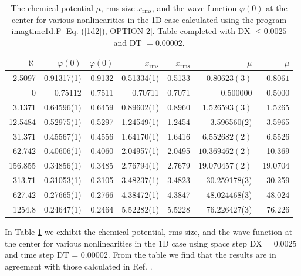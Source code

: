 \documentclass[onecolumn]{elsart3p}
\begin{document}
\begin{table}[!ht]
\begin{center}
\caption{The chemical potential $\mu$,
rms size {$x_{\mathrm{rms}}$}, and the wave function
$\varphi(0)$ at the center  for various
nonlinearities
 in the  1D case calculated using the program imagtime1d.F
[Eq. (\ref{1d2}), OPTION 2]. Table
completed with DX $\le 0.0025$ and
DT $=0.00002$.
}
\label{table3}
\begin{tabular}{|r|r|r|r|r|r|r|}
\hline
{$\aleph$} %
&   {$\varphi(0)$} &
$\varphi(0)$ \cite{Bao_Tang}&
{$x_{\mathrm{rms}}$}      &
$x_{\mathrm{rms}}$ \cite{Bao_Tang}&
{$\mu$}  &{$\mu$ \cite{Bao_Tang}} \\
\hline
  -2.5097 & 0.91317(1) &  0.9132 & 0.51334(1)& 0.5133& $-0.80623(3)$ &
$-0.8061$ \\
   0 &  0.75112 & 0.7511& 0.70711& 0.7071 & 0.500000 &0.5000    \\
    3.1371 &0.64596(1)& 0.6459 &0.89602(1)&0.8960 &$1.526593(3)$  &
1.5265\\
   12.5484 & 0.52975(1)& 0.5297 & 1.24549(1)& 1.2454 &   3.596560(2) &
3.5965 \\
  31.371 & 0.45567(1)&0.4556  & 1.64170(1)&1.6416 &  $6.552682(2)$ &
6.5526 \\
62.742&  0.40606(1)& 0.4060 &  2.04957(1) & 2.0495 & $10.369462(2)$ &
10.369
\\
156.855 &  0.34856(1) &  0.3485 &  2.76794(1) &2.7679 &$19.070457(2) $
&19.0704 \\
   313.71 & 0.31053(1) & 0.3105 &3.48237(1) &3.4823 & 30.259178(3) &
30.259
\\
  627.42 & 0.27665(1) &0.2766 & 4.38472(1) &4.3847 & 48.024468(3)  &
48.024
\\
     1254.8 & 0.24647(1) &0.2464 & 5.52282(1) &5.5228 & 76.226427(3)&
76.226
\\
\hline
\end{tabular}
\end{center}
\end{table}






In Table \ref{table3} we exhibit the chemical potential, rms size, and
the wave function at the center for various nonlinearities  in the
 1D  case using space step
DX = 0.0025 and time step DT = 0.00002. From the
table we find that the results are in agreement with those calculated
in Ref. \cite{Bao_Tang}.
\end{document}
